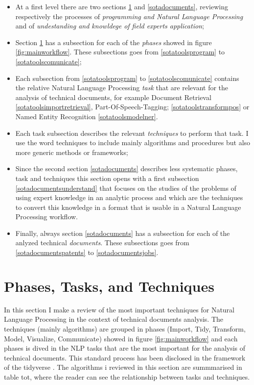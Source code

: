 \documentclass[]{book}
\providecommand{\tightlist}{%
  \setlength{\itemsep}{0pt}\setlength{\parskip}{0pt}}
\begin{document}
\begin{itemize}
\tightlist
\item
  At a first level there are two sections \ref{sotatools} and
  \ref{sotadocuments}, reviewing respectively the processes of
  \emph{programming and Natural Language Processing} and of
  \emph{undestanding and knowldege of field experts application};
\item
  Section \ref{sotatools} has a subsection for each of the \emph{phases}
  showed in figure \ref{fig:mainworkflow}. These subsections goes from
  \ref{sotatoolsprogram} to \ref{sotatoolscomunicate};
\item
  Each subsection from \ref{sotatoolsprogram} to
  \ref{sotatoolscomunicate} contains the relative Natural Language
  Processing \emph{task} that are relevant for the analysis of technical
  documents, for example Document Retrieval
  \ref{sotatoolsimportretrieval}, Part-Of-Speech-Tagging;
  \ref{sotatoolstransformpos} or Named Entity Recognition
  \ref{sotatoolsmodelner}.
\item
  Each task subsection describes the relevant \emph{techniques} to
  perform that task. I use the word techniques to include mainly
  algorithms and procedures but also more generic methods or frameworks;
\item
  Since the second section \ref{sotadocuments} describes less systematic
  phases, task and techniques this section opens with a first subsection
  \ref{sotadocumentsunderstand} that focuses on the studies of the
  problems of using expert knowledge in an analytic process and which
  are the techniques to convert this knowledge in a format that is
  usable in a Natural Language Processing workflow.
\item
  Finally, always section \ref{sotadocuments} has a subsection for each
  of the anlyzed technical \emph{documents}. These subsections goes from
  \ref{sotadocumentspatents} to \ref{sotadocumentsjobs}.
\end{itemize}

\section{Phases, Tasks, and Techniques}\label{sotatools}

In this section I make a review of the most important techniques for
Natural Language Processing in the context of technical documents
analysis. The techniques (mainly algorithms) are grouped in phases
(Import, Tidy, Transform, Model, Visualize, Communicate) showed in
figure \ref{fig:mainworkflow} and each phases is dived in the NLP tasks
that are the most important for the analysis of technical documents.
This standard process has been disclosed in the framework of the
tidyverse \citep{wickham2016r}. The algorithms i reviewed in this
section are summmarised in table tot, where the reader can see the
relationship between tasks and techniques.
\end{document}
